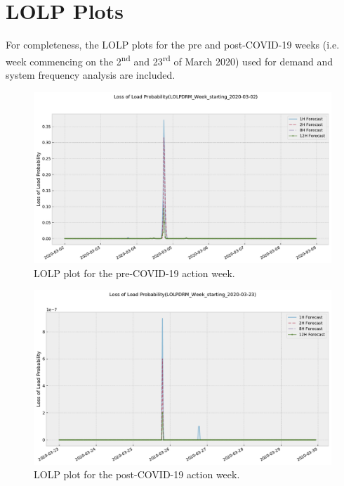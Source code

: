 \documentclass[energies,article,submit,moreauthors,pdftex]{Definitions/mdpi}
\begin{document}
\section{LOLP Plots}
For completeness, the LOLP plots for the pre and post-COVID-19 weeks (i.e. week commencing on the 2\textsuperscript{nd} and 23\textsuperscript{rd} of March 2020) used for demand and system frequency analysis are included.
\begin{figure}[H]\centering
\hspace{-25pt}\includegraphics[width=15 cm]{Graphics/LOLPDRM_Week_starting_2020-03-02no4H.pdf}
\caption{LOLP plot for the pre-COVID-19 action week.}\label{LOLPDRM_Week_starting_2020-03-02no4H}
\end{figure}  
\begin{figure}[H]\centering
\hspace{-25pt}\includegraphics[width=15 cm]{Graphics/LOLPDRM_Week_starting_2020-03-23no4H.pdf}
\caption{LOLP plot for the post-COVID-19 action week.}\label{LOLPDRM_Week_starting_2020-03-23no4H}
\end{figure}  









\end{document}
